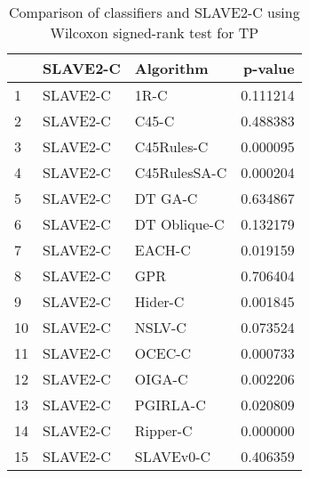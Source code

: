 \begin{table}
\footnotesize
\caption{Comparison of classifiers and SLAVE2-C using Wilcoxon signed-rank test for TP}
\label{tab:SLAVE2-C wilcoxon TP comparison}
\begin{tabular}{lllr}
\hline
 & SLAVE2-C & Algorithm & p-value \\
\hline
1 & SLAVE2-C & 1R-C & 0.111214 \\
2 & SLAVE2-C & C45-C & 0.488383 \\
3 & SLAVE2-C & C45Rules-C & 0.000095 \\
4 & SLAVE2-C & C45RulesSA-C & 0.000204 \\
5 & SLAVE2-C & DT GA-C & 0.634867 \\
6 & SLAVE2-C & DT Oblique-C & 0.132179 \\
7 & SLAVE2-C & EACH-C & 0.019159 \\
8 & SLAVE2-C & GPR & 0.706404 \\
9 & SLAVE2-C & Hider-C & 0.001845 \\
10 & SLAVE2-C & NSLV-C & 0.073524 \\
11 & SLAVE2-C & OCEC-C & 0.000733 \\
12 & SLAVE2-C & OIGA-C & 0.002206 \\
13 & SLAVE2-C & PGIRLA-C & 0.020809 \\
14 & SLAVE2-C & Ripper-C & 0.000000 \\
15 & SLAVE2-C & SLAVEv0-C & 0.406359 \\
\hline
\end{tabular}
\end{table}
